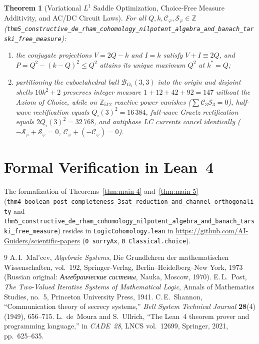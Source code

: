\documentclass[11pt,a4paper]{article}
\theoremstyle{plain}
\newtheorem{theorem}{Theorem}[section]
\theoremstyle{definition}
\begin{document}
\begin{theorem}[Variational $L^1$ Saddle Optimization, Choice-Free Measure Additivity, and AC/DC Circuit Laws]
\label{thm:main-5c}
For all $Q,k,\mathcal{C}_\varphi,\mathcal{S}_\varphi\in\mathbb{Z}$ (\texttt{thm5\_constructive\_de\_rham\_cohomology\_nilpotent\_algebra\_and\_banach\_tarski\_free\_measure}):
\begin{enumerate}[label=\textbf{(\roman*)},leftmargin=*,noitemsep]
\item the conjugate projections $V = 2Q-k$ and $I = k$ satisfy $V+I \equiv 2Q$, and $P = Q^2 - (k-Q)^2 \le Q^2$ attains its unique maximum $Q^2$ at $k^* = Q$;
\item partitioning the cuboctahedral ball $\mathcal{B}_{O_2}(3,3)$ into the origin and disjoint shells $10k^2+2$ preserves integer measure $1 + 12 + 42 + 92 = 147$ without the Axiom of Choice, while on $\mathbb{Z}_{512}$ reactive power vanishes ($\sum\mathcal{C}_3\mathcal{S}_3 = 0$), half-wave rectification equals $Q_\square(3)^2 = 16\,384$, full-wave Graetz rectification equals $2Q_\square(3)^2 = 32\,768$, and antiphase LC currents cancel identically ($-\mathcal{S}_\varphi + \mathcal{S}_\varphi = 0$, $\mathcal{C}_\varphi + (-\mathcal{C}_\varphi) = 0$).
\end{enumerate}
\end{theorem}

\section{Formal Verification in Lean~4}
\label{sec:lean4}

The formalization of Theorems~\ref{thm:main-4} and~\ref{thm:main-5} (\texttt{thm4\_boolean\_post\_completeness\_3sat\_reduction\_and\_channel\_orthogonality} and \texttt{thm5\_constructive\_de\_rham\_cohomology\_nilpotent\_algebra\_and\_banach\_tarski\_free\_measure}) resides in \texttt{LogicCohomology.lean} in \url{https://github.com/AI-Guiders/scientific-papers} (\texttt{0 sorryAx}, \texttt{0 Classical.choice}).

\begin{thebibliography}{9}
A.\,I.~Mal'cev, \emph{Algebraic Systems}, Die Grundlehren der mathematischen Wissenschaften, vol.~192, Springer-Verlag, Berlin--Heidelberg--New York, 1973 (Russian original: \emph{Алгебраические системы}, Nauka, Moscow, 1970).
E.\,L.~Post, \emph{The Two-Valued Iterative Systems of Mathematical Logic}, Annals of Mathematics Studies, no.~5, Princeton University Press, 1941.
C.\,E.~Shannon, ``Communication theory of secrecy systems,'' \emph{Bell System Technical Journal} \textbf{28}(4) (1949), 656--715.
L.~de~Moura and S.~Ullrich, ``The Lean~4 theorem prover and programming language,'' in \emph{CADE~28}, LNCS vol.~12699, Springer, 2021, pp.~625--635.
\end{thebibliography}
\end{document}

